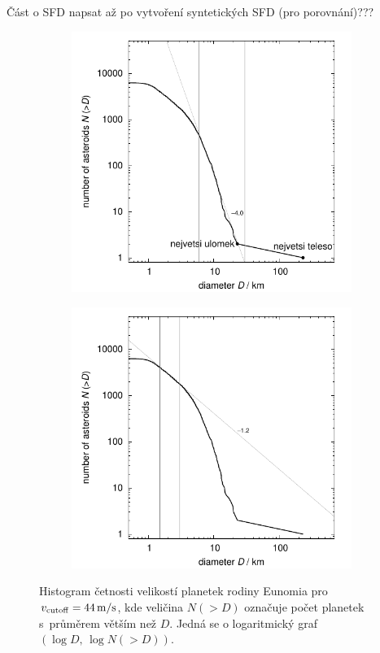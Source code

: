 \documentclass[A4paper, 12pt, oneside]{book}
\begin{document}
Část o SFD napsat až po vytvoření syntetických SFD (pro porovnání)???
\begin{figure}
	\centering
	\begin{subfigure}[b]{0.45\textwidth}
	\includegraphics[width=\textwidth]{obr/size_distribution}
	\end{subfigure}
	\begin{subfigure}[b]{0.45\textwidth}
	\includegraphics[width=\textwidth]{obr/size_distribution_SMALLD}
	\end{subfigure}
	\caption{Histogram četnosti velikostí planetek rodiny Eunomia pro $v_{\rm cutoff}=44\,{\rm m/s}$, kde veličina $N({>}D)$ označuje počet planetek s~průměrem větším než $D$. Jedná se o logaritmický graf $(\log D,\,\log N({>}D))$.}
	\label{size_distribution}
\end{figure}
\end{document}
